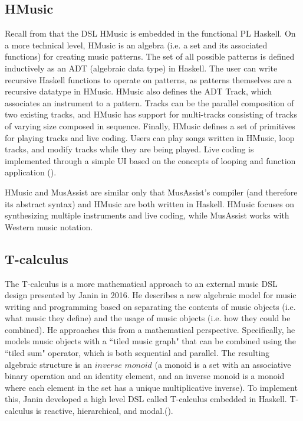 \documentclass{report}
\newcommand\citeparen[1]{(\cite{#1})}
\begin{document}
\subsection{HMusic}
Recall from  that the DSL HMusic is embedded in the functional PL Haskell. On a  more  technical level, HMusic is an algebra (i.e. a set and its associated functions) for creating music  patterns. The set of  all possible patterns is defined  inductively as an ADT (algebraic data  type) in Haskell. The user can write recursive  Haskell functions to operate on patterns, as patterns  themselves are a recursive datatype in HMusic. HMusic also defines the ADT Track, which associates an instrument to a pattern. Tracks can be  the parallel composition of two existing  tracks, and HMusic has support for multi-tracks consisting of tracks of varying size composed in sequence. Finally, HMusic defines a set of primitives for playing  tracks and live coding. Users can play songs  written in HMusic, loop tracks, and  modify tracks while they are being  played. Live coding is implemented through a simple  UI  based  on the concepts of looping and  function application \citeparen{bois_ribeiro_1970}.

HMusic and MusAssist are similar only that MusAssist's compiler (and therefore its abstract syntax) and HMusic are both written in Haskell. HMusic focuses on synthesizing multiple instruments and live coding, while MusAssist works with Western music notation.

\subsection{T-calculus}
The T-calculus is a more mathematical  approach to an external music DSL design presented by Janin in 2016. He describes  a  new  algebraic model for music  writing and  programming based on separating  the contents of music objects (i.e.  what  music  they define)  and the usage of music  objects  (i.e.  how  they could be  combined). He approaches this from a mathematical perspective. Specifically, he  models music objects with a ``tiled music graph" that can be combined using the  ``tiled  sum"  operator, which is both sequential and parallel. The  resulting algebraic structure is  an $inverse$ $monoid$  (a monoid is  a set with an associative binary operation and  an identity element, and an inverse monoid is a monoid where each element  in the set has a unique multiplicative inverse). To  implement this, Janin developed a high  level DSL called T-calculus embedded  in Haskell. T-calculus  is  reactive, hierarchical, and modal.\citeparen{janin}.
\end{document}
